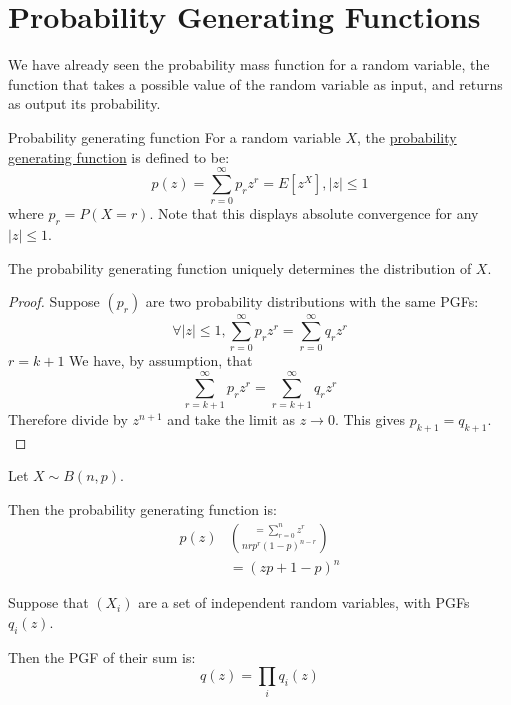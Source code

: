 \documentclass[../Main.tex]{subfiles}
\begin{document}
\section{Probability Generating Functions}
We have already seen the probability mass function for a random variable, the function that takes a possible value of the random variable as input, and returns as output its probability.
\begin{definition}{Probability generating function}
    For a random variable $X$, the \underline{probability generating function} is defined to be:
    \begin{equation*}
        p(z) = \sum_{r = 0}^\infty p_r z^r = E[z^X], |z| \leq 1
    \end{equation*}
    where $p_r = P(X = r)$. Note that this displays absolute convergence for any $|z| \leq 1$.
\end{definition}
\begin{theorem}
    The probability generating function uniquely determines the distribution of $X$.
\end{theorem}
\begin{proof}
    Suppose $(p_r)$ are two probability distributions with the same PGFs:
    \begin{equation}
        \forall |z| \leq 1, \sum_{r = 0}^\infty p_r z^r = \sum_{r = 0}^\infty q_r z^r
        \label{eqnEqualPGFs}
    \end{equation}
    {$r = k + 1$}{
        We have, by assumption, that
        \begin{equation*}
            \sum_{r = k + 1}^{\infty} p_r z^r = \sum_{r = k + 1}^{\infty} q_r z^r
        \end{equation*}
        Therefore divide by $z^{n+1}$ and take the limit as $z \to 0$. This gives $p_{k + 1} = q_{k + 1}$.
    }
\end{proof}
\begin{example}
    Let $X \sim B(n, p)$.\par
    Then the probability generating function is:
    \begin{align*}
        p(z) &= \sum_{r = 0}^n z^r \choose{n}{r} p^r (1-p)^{n-r} \\
        &= (zp + 1 - p)^n
    \end{align*}
\end{example}
\begin{proposition}
    Suppose that $(X_i)$ are a set of independent random variables, with PGFs $q_i(z)$.\par
    Then the PGF of their sum is:
    \begin{equation*}
        q(z) = \prod_i q_i(z)
    \end{equation*}
\end{proposition}
\end{document}
